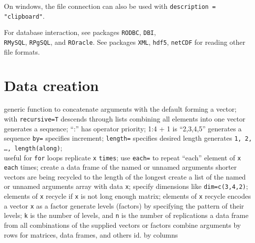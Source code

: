 On windows, the file connection can also be used with {\tt description =
"clipboard"}.



For database interaction, see packages {\tt RODBC}, {\tt DBI},\\
{\tt RMySQL}, {\tt RPgSQL}, and {\tt ROracle}. See packages {\tt XML},
{\tt hdf5}, {\tt netCDF} for reading other file formats.

\section{Data creation}{}

	{generic function to concatenate arguments with the default forming a vector; with {\tt recursive=T} descends through lists combining all elements into one vector}
	{generates a sequence; ``:'' has operator priority; 1:4 + 1 is ``2,3,4,5''}
	{generates a sequence {\tt by=} specifies increment; {\tt length=} specifies desired length}
	{generates {\tt 1, 2, \ldots, length(along)};\\useful for {\tt for} loops}
	{replicate {\tt x} {\tt times}; use {\tt each=} to repeat ``each'' element of {\tt x} {\tt each} times;}
	{create a data frame of the named or unnamed arguments}
	{shorter vectors are being recycled to the length of the longest}
	{create a list of the named or unnamed arguments }
	{array with data {\tt x}; specify dimensions like {\tt dim=c(3,4,2)}; elements of {\tt x} recycle if {\tt x} is not long enough}
	{matrix; elements of {\tt x} recycle}
	{encodes a vector {\tt x} as a factor}
	{generate levels (factors) by specifying the pattern of their levels; {\tt k} is the number of levels, and {\tt n} is the number of replications}
	{a data frame from all combinations of the supplied vectors or factors}
	{combine arguments by rows for matrices, data frames, and others}
	{id. by columns}
